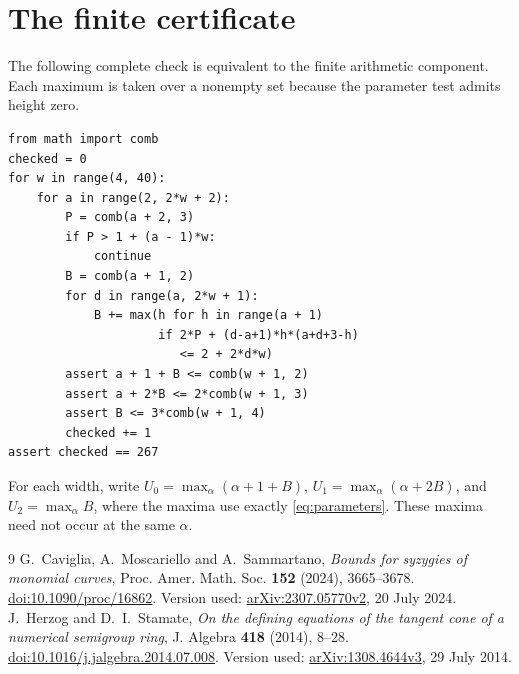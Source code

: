 \documentclass[11pt,a4paper]{article}
\begin{document}
\appendix
\section{The finite certificate}\label{app:certificate}
The following complete check is equivalent to the finite arithmetic component. Each maximum is taken over a nonempty set because the parameter test admits height zero.
\begin{small}
\begin{verbatim}
from math import comb
checked = 0
for w in range(4, 40):
    for a in range(2, 2*w + 2):
        P = comb(a + 2, 3)
        if P > 1 + (a - 1)*w:
            continue
        B = comb(a + 1, 2)
        for d in range(a, 2*w + 1):
            B += max(h for h in range(a + 1)
                     if 2*P + (d-a+1)*h*(a+d+3-h)
                        <= 2 + 2*d*w)
        assert a + 1 + B <= comb(w + 1, 2)
        assert a + 2*B <= 2*comb(w + 1, 3)
        assert B <= 3*comb(w + 1, 4)
        checked += 1
assert checked == 267
\end{verbatim}
\end{small}

\clearpage
For each width, write $U_0=\max_\alpha(\alpha+1+B)$, $U_1=\max_\alpha(\alpha+2B)$, and $U_2=\max_\alpha B$, where the maxima use exactly \eqref{eq:parameters}. These maxima need not occur at the same $\alpha$.
\begin{table}[!ht]
\centering\small

\caption{Envelope bounds for all small widths. Each triple is bounded respectively by $\binom{w+1}{2}$, $2\binom{w+1}{3}$, and $3\binom{w+1}{4}$.}\label{tab:certificate}
\end{table}

\begin{thebibliography}{9}
G.~Caviglia, A.~Moscariello and A.~Sammartano,
\emph{Bounds for syzygies of monomial curves},
Proc. Amer. Math. Soc. \textbf{152} (2024), 3665--3678.
\href{https://doi.org/10.1090/proc/16862}{doi:10.1090/proc/16862}.
Version used: \href{https://arxiv.org/abs/2307.05770v2}{arXiv:2307.05770v2}, 20 July 2024.
J.~Herzog and D.~I.~Stamate,
\emph{On the defining equations of the tangent cone of a numerical semigroup ring},
J. Algebra \textbf{418} (2014), 8--28.
\href{https://doi.org/10.1016/j.jalgebra.2014.07.008}{doi:10.1016/j.jalgebra.2014.07.008}.
Version used: \href{https://arxiv.org/abs/1308.4644v3}{arXiv:1308.4644v3}, 29 July 2014.
\end{thebibliography}
\end{document}
